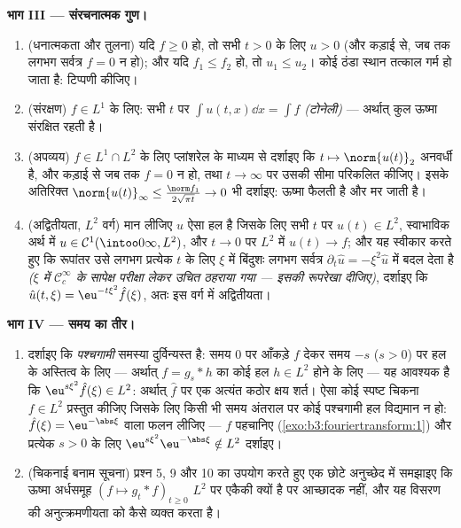 \begin{problem}[{सप्ताहांत समस्या --- $\partial_tu =
\partial^2_{xx}u$, आरंभ से अंत तक हल}]
\medskip
\noindent\textbf{भाग III --- संरचनात्मक गुण।}
\begin{enumerate}[resume]
  \item (धनात्मकता और तुलना) यदि $f \geq 0$ हो, तो सभी $t > 0$ के लिए
        $u > 0$ (और कड़ाई से, जब तक लगभग सर्वत्र $f = 0$ न हो); और
        यदि $f_1 \leq f_2$ हो, तो $u_1 \leq u_2$। कोई ठंडा स्थान तत्काल गर्म हो जाता
        है: टिप्पणी कीजिए।
  \item (संरक्षण) $f \in L^1$ के लिए: सभी $t$ पर $\int u(t, x)\dd x =
        \int f$ \emph{(टोनेली)}
        --- अर्थात् कुल ऊष्मा संरक्षित रहती है।
  \item (अपव्यय) $f \in L^1\cap L^2$ के लिए प्लांशरेल के माध्यम से दर्शाइए कि
        $t \mapsto \norm{u(t)}_2$ अनवर्धी है, और कड़ाई से जब तक $f = 0$ न हो, तथा $t \to \infty$
        पर उसकी सीमा परिकलित कीजिए। इसके अतिरिक्त $\norm{u(t)}_\infty \leq \frac{\norm
        f_1}{2\sqrt{\pi t}} \to 0$ भी
        दर्शाइए: ऊष्मा फैलती है और मर जाती है।
  \item (अद्वितीयता, $L^2$ वर्ग) मान लीजिए $u$ ऐसा हल है जिसके
        लिए सभी $t$ पर $u(t) \in L^2$, स्वाभाविक अर्थ में $u \in \mathcal
        C^1(\intoo0\infty, L^2)$, और
        $t\to0$ पर $L^2$ में $u(t) \to f$; और यह स्वीकार करते हुए कि
        रूपांतर उसे लगभग प्रत्येक $t$ के लिए $\xi$ में बिंदुशः
        लगभग सर्वत्र $\partial_t\hat u =
        -\xi^2\hat u$ में बदल देता है \emph{($\xi$ में $\mathcal
        C_c^\infty$
        के सापेक्ष परीक्षा लेकर उचित ठहराया गया --- इसकी रूपरेखा
        दीजिए)}, दर्शाइए कि $\hat u(t,\xi) = \eu^{-t\xi^2}\hat f(\xi)$, अतः इस वर्ग में अद्वितीयता।
\end{enumerate}

\medskip
\noindent\textbf{भाग IV --- समय का तीर।}
\begin{enumerate}[resume]
  \item दर्शाइए कि \emph{पश्चगामी} समस्या दुर्विन्यस्त है: समय
        $0$ पर आँकड़े $f$ देकर समय $-s$ ($s > 0$) पर हल के
        अस्तित्व के लिए --- अर्थात् $f = g_s * h$ का कोई हल $h \in L^2$ होने के
        लिए --- यह आवश्यक है कि $\eu^{s\xi^2}\hat f(\xi) \in L^2$: अर्थात् $\hat f$ पर एक अत्यंत
        कठोर क्षय शर्त। ऐसा कोई स्पष्ट चिकना $f
        \in L^2$ प्रस्तुत कीजिए
        जिसके लिए किसी भी समय अंतराल पर कोई पश्चगामी हल विद्यमान
        न हो: $\hat f(\xi) =
        \eu^{-\abs\xi}$ वाला फलन लीजिए --- $f$ पहचानिए (\cref{exo:b3:fouriertransform:1}) और
        प्रत्येक $s >
        0$ के लिए $\eu^{s\xi^2}\eu^{-\abs\xi} \notin L^2$ दर्शाइए।
  \item (चिकनाई बनाम सूचना) प्रश्न 5, 9 और 10 का उपयोग करते हुए
        एक छोटे अनुच्छेद में समझाइए कि ऊष्मा अर्धसमूह $(f \mapsto g_t * f)_{t\geq0}$ $L^2$
        पर एकैकी क्यों है पर आच्छादक नहीं, और यह विसरण की
        अनुत्क्रमणीयता को कैसे व्यक्त करता है।
\end{enumerate}


\end{problem}
